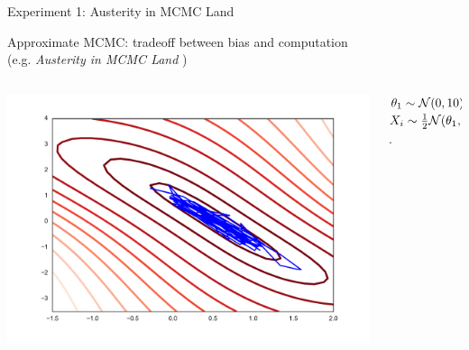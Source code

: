 \documentclass{beamer}
\begin{document}
 \begin{frame}{Experiment 1: Austerity in MCMC Land}
 \begin{center}
   Approximate MCMC: tradeoff between bias and computation\\ (e.g. {\em Austerity in MCMC Land} \cite{korattikara2013austerity})
   \end{center}
\begin{columns}
        \begin{column}{.7\textwidth}
   \includegraphics[width=\textwidth]{./img/sgld_trace_and_density.pdf} 
        \end{column}
        \begin{column}{.3\textwidth}
$\theta_{1}\sim{\cal N}(0,10);\theta_{2}\sim{\cal N}(0,1)$\\
$ X_{i}\sim\frac{1}{2}{\cal N}(\theta_{1},4)+\frac{1}{2}{\cal N}(\theta_{1}+\theta_{2},4) $.
        \end{column}
\end{columns}
 \end{frame}

\end{document}
